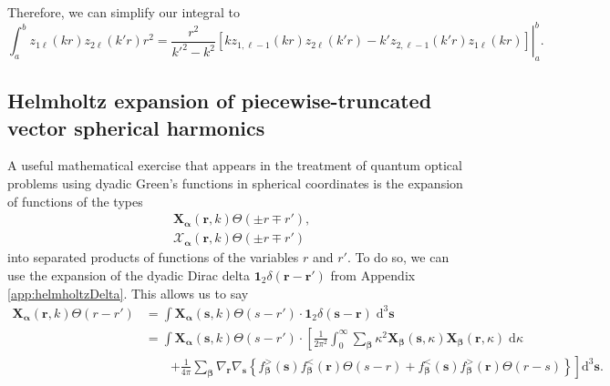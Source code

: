 Therefore, we can simplify our integral to
\begin{equation}
\int_a^bz_{1\ell}(kr)z_{2\ell}(k'r)r^2 = \left.\frac{r^2}{k'^2 - k^2}\left[kz_{1,\ell - 1}(kr)z_{2\ell}(k'r) - k'z_{2,\ell - 1}(k'r)z_{1\ell}(kr)\right]\right|_a^b.
\end{equation}








\subsection{Helmholtz expansion of piecewise-truncated vector spherical harmonics}\label{sec:truncatedHarmonicExpansion}

A useful mathematical exercise that appears in the treatment of quantum optical problems using dyadic Green's functions in spherical coordinates is the expansion of functions of the types
\begin{equation}
\begin{split}
&\mathbf{X}_{\bm{\alpha}}(\mathbf{r},k)\Theta(\pm r\mp r'),\\
&\bm{\mathcal{X}}_{\bm{\alpha}}(\mathbf{r},k)\Theta(\pm r\mp r')
\end{split}
\end{equation}
into separated products of functions of the variables $r$ and $r'$. To do so, we can use the expansion of the dyadic Dirac delta $\bm{1}_2\delta(\mathbf{r} - \mathbf{r}')$ from Appendix \ref{app:helmholtzDelta}. This allows us to say
\begin{equation}\label{eq:truncatedVectorHarmonicExpansion1}
\begin{split}
\mathbf{X}_{\bm{\alpha}}(\mathbf{r},k)\Theta(r - r') &= \int\mathbf{X}_{\bm{\alpha}}(\mathbf{s},k)\Theta(s - r')\cdot\bm{1}_2\delta(\mathbf{s} - \mathbf{r})\;\mathrm{d}^3\mathbf{s}\\
&= \int\mathbf{X}_{\bm{\alpha}}(\mathbf{s},k)\Theta(s - r')\cdot\left[\frac{1}{2\pi^2}\int_0^\infty\sum_{\bm{\beta}}\kappa^2\mathbf{X}_{\bm{\beta}}(\mathbf{s},\kappa)\mathbf{X}_{\bm{\beta}}(\mathbf{r},\kappa)\;\mathrm{d}\kappa\right.\\
&\qquad\left.+ \frac{1}{4\pi}\sum_{\bm{\beta}}\nabla_\mathbf{r}\nabla_\mathbf{s}\left\{ f_{\bm{\beta}}^>(\mathbf{s})f_{\bm{\beta}}^<(\mathbf{r})\Theta(s - r) +  f_{\bm{\beta}}^<(\mathbf{s})f_{\bm{\beta}}^>(\mathbf{r})\Theta(r - s)\right\}\right]\mathrm{d}^3\mathbf{s}.\\
\end{split}
\end{equation}
